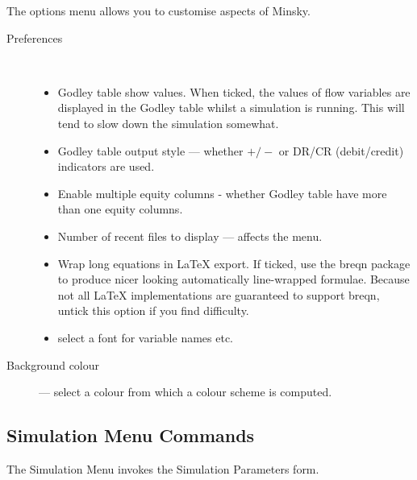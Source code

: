 The options menu allows you to customise aspects of Minsky.
\begin{description}
\item [{Preferences}]~
\begin{itemize}
\item Godley table show values. When ticked, the values of flow variables
are displayed in the Godley table whilst a simulation is running.
This will tend to slow down the simulation somewhat. 
\item Godley table output style --- whether $+/-$ or DR/CR (debit/credit)
indicators are used. 
\item Enable multiple equity columns - whether Godley table have more than
one equity columns. 
\item Number of recent files to display --- affects the  menu. 
\item \label{wrap-equations-1} Wrap long equations in LaTeX export. If
ticked, use the breqn package to produce nicer looking automatically
line-wrapped formulae. Because not all LaTeX implementations are guaranteed
to support breqn, untick this option if you find difficulty. 
\item \label{font-1} select a font for variable names etc. 
\end{itemize}
\item [{Background colour}] --- select a colour from which a colour scheme
is computed.
\end{description}

\subsection{Simulation Menu Commands}

\label{RungeKutta}

The Simulation Menu invokes the Simulation Parameters form.

